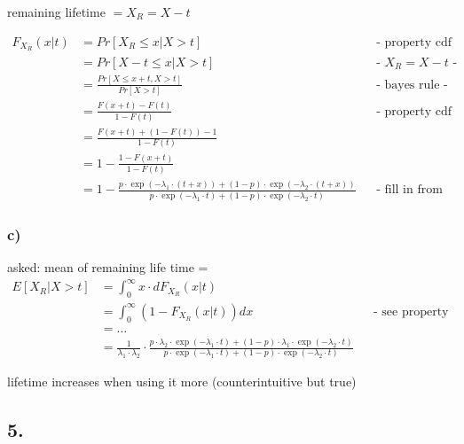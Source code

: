 remaining lifetime $=X_{R}=X-t$

\begin{align*}
F_{{X_{R}}}\left(x|t\right)&=Pr\left[X_{R}\le x|X> t\right]&& \text{-  property cdf -}\\
&=Pr\left[X-t\le x|X> t\right]&& \text{-  $X_{R}=X-t$ -}\\
&=\frac{Pr\left[X\le x+t,X> t\right]}{Pr\left[X> t\right]}&& \text{-  bayes rule -}\\
&=\frac{F\left(x+t\right)-F\left(t\right)}{1-F\left(t\right)}&& \text{-  property cdf -}\\
&=\frac{F\left(x+t\right)+\left(1-F\left(t\right)\right)-1}{1-F\left(t\right)}\\
&=1-\frac{1-F\left(x+t\right)}{1-F\left(t\right)}\\
&=1-\frac{p\cdot \exp \left(-\lambda _{1}\cdot \left(t+x\right)\right)+\left(1-p\right)\cdot \exp \left(-\lambda _{2}\cdot \left(t+x\right)\right)}{p\cdot \exp \left(-\lambda _{1}\cdot t\right)+\left(1-p\right)\cdot \exp \left(-\lambda _{2}\cdot t\right)}&& \text{-  fill in from given -}
\end{align*}

\subsubsection*{c) }

asked: mean of remaining life time =
\begin{align*}
E\left[X_{R}|X> t\right]&=\int _{0}^{\infty }x\cdot dF_{{X_{R}}}\left(x|t\right)\\
&=\int _{0}^{\infty }\left(1-F_{{X_{R}}}\left(x|t\right)\right)dx&& \text{-  see property mean r.v. -}\\
&=\ldots \\
&=\frac{1}{\lambda _{1}\cdot \lambda _{2}}\cdot \frac{p\cdot \lambda _{2}\cdot \exp \left(-\lambda _{1}\cdot t\right)+\left(1-p\right)\cdot \lambda _{1}\cdot \exp \left(-\lambda _{2}\cdot t\right)}{p\cdot \exp \left(-\lambda _{1}\cdot t\right)+\left(1-p\right)\cdot \exp \left(-\lambda _{2}\cdot t\right)}
\end{align*}

lifetime increases when using it more (counterintuitive but true)

\clearpage

\subsection*{ 5. }


